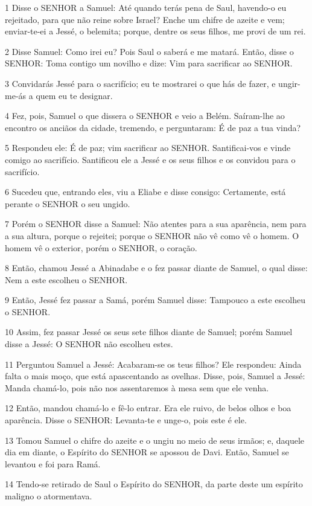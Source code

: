 \par 1 Disse o SENHOR a Samuel: Até quando terás pena de Saul, havendo-o eu rejeitado, para que não reine sobre Israel? Enche um chifre de azeite e vem; enviar-te-ei a Jessé, o belemita; porque, dentre os seus filhos, me provi de um rei.
\par 2 Disse Samuel: Como irei eu? Pois Saul o saberá e me matará. Então, disse o SENHOR: Toma contigo um novilho e dize: Vim para sacrificar ao SENHOR.
\par 3 Convidarás Jessé para o sacrifício; eu te mostrarei o que hás de fazer, e ungir-me-ás a quem eu te designar.
\par 4 Fez, pois, Samuel o que dissera o SENHOR e veio a Belém. Saíram-lhe ao encontro os anciãos da cidade, tremendo, e perguntaram: É de paz a tua vinda?
\par 5 Respondeu ele: É de paz; vim sacrificar ao SENHOR. Santificai-vos e vinde comigo ao sacrifício. Santificou ele a Jessé e os seus filhos e os convidou para o sacrifício.
\par 6 Sucedeu que, entrando eles, viu a Eliabe e disse consigo: Certamente, está perante o SENHOR o seu ungido.
\par 7 Porém o SENHOR disse a Samuel: Não atentes para a sua aparência, nem para a sua altura, porque o rejeitei; porque o SENHOR não vê como vê o homem. O homem vê o exterior, porém o SENHOR, o coração.
\par 8 Então, chamou Jessé a Abinadabe e o fez passar diante de Samuel, o qual disse: Nem a este escolheu o SENHOR.
\par 9 Então, Jessé fez passar a Samá, porém Samuel disse: Tampouco a este escolheu o SENHOR.
\par 10 Assim, fez passar Jessé os seus sete filhos diante de Samuel; porém Samuel disse a Jessé: O SENHOR não escolheu estes.
\par 11 Perguntou Samuel a Jessé: Acabaram-se os teus filhos? Ele respondeu: Ainda falta o mais moço, que está apascentando as ovelhas. Disse, pois, Samuel a Jessé: Manda chamá-lo, pois não nos assentaremos à mesa sem que ele venha.
\par 12 Então, mandou chamá-lo e fê-lo entrar. Era ele ruivo, de belos olhos e boa aparência. Disse o SENHOR: Levanta-te e unge-o, pois este é ele.
\par 13 Tomou Samuel o chifre do azeite e o ungiu no meio de seus irmãos; e, daquele dia em diante, o Espírito do SENHOR se apossou de Davi. Então, Samuel se levantou e foi para Ramá.
\par 14 Tendo-se retirado de Saul o Espírito do SENHOR, da parte deste um espírito maligno o atormentava.
